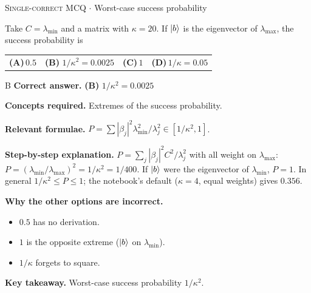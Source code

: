 \documentclass[11pt,a4paper]{article}
\newcommand{\optlabel}[1]{\textbf{(#1)}}
\newcommand{\correctlabel}[1]{\textcolor{okgreen}{\textbf{(#1)}\,\ding{51}}}
\newenvironment{qitem}[1]{\begin{list}{}{\setlength{\leftmargin}{3.3em}\setlength{\labelwidth}{3.1em}%
  \setlength{\labelsep}{0.2em}\setlength{\topsep}{3pt}\setlength{\parsep}{3pt}}\item[\textbf{Q.#1}\hfill]}{\end{list}}
\newcommand{\qsep}{\par\vspace{2pt}{\color{black!15}\hrule}\vspace{4pt}}
\newcommand{\qmeta}[2]{{\footnotesize\color{black!60}\textsc{#1} \;$\cdot$\; #2}\par}
\begin{document}
\begin{qitem}{70}
\qmeta{Single-correct MCQ}{Worst-case success probability}
Take $C = \lambda_{\min}$ and a matrix with $\kappa = 20$. If $\ket b$ is the eigenvector of $\lambda_{\max}$, the success probability is
\par\smallskip\noindent\begin{tabularx}{\linewidth}{@{}*{4}{L}@{}}
\optlabel{A}\,$0.5$ & \correctlabel{B}\,$1/\kappa^2 = 0.0025$ & \optlabel{C}\,$1$ & \optlabel{D}\,$1/\kappa = 0.05$
\end{tabularx}
\end{qitem}
\begin{solbox}{B}
\textbf{\color{brand}Correct answer.} \textcolor{okgreen}{\textbf{(B)}} $1/\kappa^2 = 0.0025$

\textbf{\color{brand}Concepts required.} Extremes of the success probability.

\textbf{\color{brand}Relevant formulae.} $P = \sum|\beta_j|^2\lambda_{\min}^2/\lambda_j^2 \in [1/\kappa^2, 1]$.

\textbf{\color{brand}Step-by-step explanation.} $P = \sum_j|\beta_j|^2C^2/\lambda_j^2$ with all weight on $\lambda_{\max}$: $P = (\lambda_{\min}/\lambda_{\max})^2 = 1/\kappa^2 = 1/400$. If $\ket b$ were the eigenvector of $\lambda_{\min}$, $P = 1$. In general
$1/\kappa^2 \le P \le 1$; the notebook's default ($\kappa = 4$, equal weights) gives $0.356$.

\textbf{\color{brand}Why the other options are incorrect.}
\begin{itemize}[leftmargin=2.4em, itemsep=1pt, topsep=2pt]
\item[\textbf{(A)}] $0.5$ has no derivation.
\item[\textbf{(C)}] $1$ is the opposite extreme ($\ket b$ on $\lambda_{\min}$).
\item[\textbf{(D)}] $1/\kappa$ forgets to square.
\end{itemize}
\textbf{\color{brand}Key takeaway.} Worst-case success probability $1/\kappa^2$.
\end{solbox}
\qsep
\end{document}
